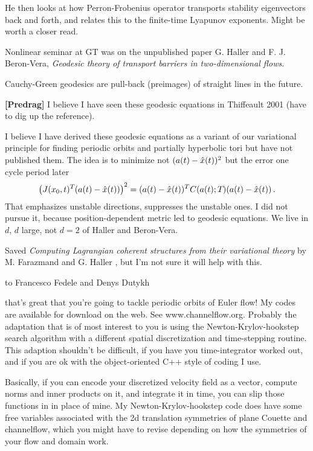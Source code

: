 \begin{description}
He then looks at how Perron-Frobenius operator transports
stability eigenvectors back and forth, and relates this to
the finite-time Lyapunov exponents. Might be worth a closer read.

\item[2012-04-03 George Haller]
Nonlinear seminar at GT was on the unpublished paper G. Haller and F. J.
Beron-Vera, \emph{Geodesic theory of transport barriers in
two-dimensional flows}.

Cauchy-Green geodesics are pull-back (preimages) of straight lines in the future.



{\bf [Predrag]}
I believe I have seen these geodesic equations in Thiffeault 2001 (have
to dig up  the reference).

I believe I have derived these geodesic equations as a variant of our
variational principle for finding periodic orbits and partially
hyperbolic tori but have not published
them. The idea is to minimize not $(a(t) -\hat{x}(t))^2$ but
the error one cycle period later
\[
\left(J({x_0},t)^{T_{}}(a(t) -\hat{x}(t))\right)^2
= (a(t) -\hat{x}(t))^T C(a(t); {T_{}})(a(t) -\hat{x}(t))
\,.
\]
That emphasizes unstable directions, suppresses the unstable ones. I did
not pursue it, because position-dependent metric led to geodesic
equations. We live in $d$\dmn, $d$ large, not $d=2$ of Haller and
Beron-Vera.

\item[2012-04-16 Predrag] Saved \emph{Computing Lagrangian coherent
structures from their variational theory} by M. Farazmand and G.
Haller ,
but I'm not sure it will help with this.

\item[2012-04-16 John Gibson] to Francesco Fedele and Denys Dutykh

that's great that you're going to tackle periodic orbits of Euler
flow! My codes are available for download on the web. See
www.channelflow.org. Probably the adaptation that is of most interest
to you is using the Newton-Krylov-hookstep search algorithm with a
different spatial discretization and time-stepping routine. This
adaption shouldn't be difficult, if you have you time-integrator
worked out, and if you are ok with the object-oriented C++ style of
coding I use.

Basically, if you can encode your discretized velocity field as a
vector, compute norms and inner products on it, and integrate it in
time, you can slip those functions in in place of mine. My
Newton-Krylov-hookstep code does have some free variables associated
with the 2d translation symmetries of plane Couette and channelflow,
which you might have to revise depending on how the symmetries of your
flow and domain work.


\end{description}
